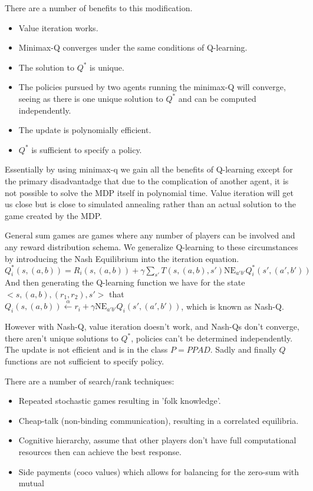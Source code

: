 \documentclass{article}
\begin{document}
There are a number of benefits to this modification.
\begin{itemize}
\item Value iteration works. 
\item Minimax-Q converges under the same conditions of Q-learning. 
\item The solution to $Q^*$ is unique. 
\item The policies pursued by two agents running the minimax-Q will converge,
seeing as there is one unique solution to $Q^*$ and can be computed
independently.
\item The update is polynomially efficient. 
\item $Q^*$ is sufficient to specify a policy.
\end{itemize}

Essentially by using minimax-q we gain all the benefits of Q-learning except 
for the primary disadvantadge that due to the complication of another agent, 
it is not possible to solve the MDP itself in polynomial time. Value iteration
will get us close but is close to simulated annealing rather than an actual 
solution to the game created by the MDP. 

General sum games are games where any number of players can be involved and
any reward distribution schema. We generalize Q-learning to these circumstances
by introducing the Nash Equilibrium into the iteration equation. $Q_i^*(s,(a,b))
= R_i(s,(a,b)) + \gamma\sum_{s'}T(s,(a,b),s')\text{NE}_{a'b'}Q_i^*(s',(a',b'))$
And then generating the Q-learning function we have for the state $<s,(a,b),(r_1
,r_2),s'>$ that $Q_i(s,(a,b)) \xleftarrow{\alpha} r_i + \gamma\text{NE}_{a'b'}
Q_i(s',(a',b'))$, which is known as Nash-Q.

However with Nash-Q, value iteration doesn't work, and Nash-Qs don't converge, 
there aren't unique solutions to $Q^*$, policies can't be determined 
independently. The update is not efficient and is in the class $P = PPAD$. 
Sadly and finally $Q$ functions are not sufficient to specify policy. 

There are a number of search/rank techniques:
\begin{itemize}
\item Repeated stochastic games resulting in 'folk knowledge'.
\item Cheap-talk (non-binding communication), resulting in a correlated 
equilibria.
\item Cognitive hierarchy, assume that other players don't have full 
computational resources then can achieve the best response.
\item Side payments (coco values) which allows for balancing for the zero-sum
with mutual
\end{itemize}
\end{document}
